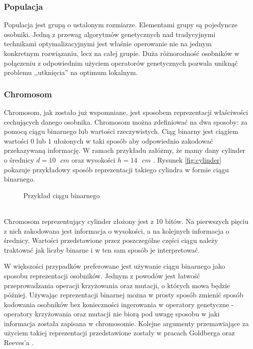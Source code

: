 \documentclass[twoside]{iisthesis}
\begin{document}
\subsubsection{Populacja}
Populacja jest grupą o ustalonym rozmiarze. Elementami grupy są pojedyncze osobniki. Jedną z przewag algorytmów genetycznych nad tradycyjnymi technikami optymalizacyjnymi jest właśnie operowanie nie na jednym konkretnym rozwiązaniu, lecz na całej grupie. Duża różnorodność osobników w połączeniu z odpowiednim użyciem operatorów genetycznych pozwala uniknąć problemu ,,utknięcia'' na optimum lokalnym.
\subsubsection{Chromosom}
Chromosom, jak zostało już wspomniane, jest sposobem reprezentacji właściwości cechujących danego osobnika. Chromosom można zdefiniować na dwa sposoby: za pomocą ciągu binarnego lub wartości rzeczywistych. Ciąg binarny jest ciągiem wartości $0$ lub $1$ ułożonych w taki sposób aby odpowiednio zakodować przekazywaną informację. W ramach przykładu załóżmy, że mamy dany cylinder o średnicy $d = 10\text{ }cm$ oraz wysokości $h = 14\text{ }cm$ \cite{book}. Rysunek \eqref{fig:cylinder} pokazuje przykładowy sposób reprezentacji takiego cylindra w formie ciągu binarnego. 
\begin{figure}[!htb]
	\centering
	\caption{Przykład ciągu binarnego}
	\label{fig:cylinder}
\end{figure}
\\Chromosom reprezentujący cylinder złożony jest z 10 bitów. Na pierwszych pięciu z nich zakodowana jest informacja o wysokości, a na kolejnych informacja o średnicy. Wartości przedstawione przez poszczególne części ciągu należy traktować jak liczby binarne i w ten sam sposób je interpretować.

W większości przypadków preferowane jest używanie ciągu binarnego jako sposobu reprezentacji osobników. Jednym z powodów jest łatwość przeprowadzania operacji krzyżowania oraz mutacji, o których mowa będzie później. Używając reprezentacji binarnej można w prosty sposób zmienić sposób kodowania osobników bez konieczności ingerowania w operatory genetyczne - operatory krzyżowania oraz mutacji nie biorą pod uwagę sposobu w jaki informacja została zapisana w chromosomie. Kolejne argumenty przemawiające za użyciem takiej reprezentacji przedstawione zostały w pracach Goldberga \cite{goldberg} oraz Reeves'a \cite{reeves}.
\end{document}
